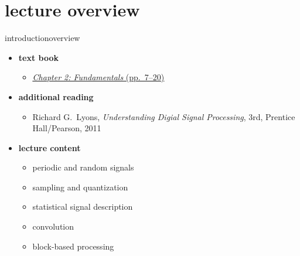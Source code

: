 

\subtitle{Part 3.1: Fundamentals I}


	

    \section[overview]{lecture overview}
        \begin{frame}{introduction}{overview}
            \begin{itemize}
                \item   \textbf{text book}  
                    \begin{itemize}
                        \item   \href{http://ieeexplore.ieee.org/xpl/ebooks/bookPdfWithBanner.jsp?fileName=6331119.pdf&bkn=6266785&pdfType=chapter}{\underline{\textit{Chapter 2: Fundamentals} (pp.~7--20)}}
                    \end{itemize}
                \item   \textbf{additional reading}  
                    \begin{itemize}
                        \item   Richard G.~Lyons, \textit{Understanding Digial Signal Processing}, 3rd, Prentice Hall/Pearson, 2011
                    \end{itemize}
                \bigskip
                \item<2->   \textbf{lecture content}
                    \begin{itemize}
                        \item<2->   periodic and random signals
                        \item<3->   sampling and quantization
                        \item<4->   statistical signal description
                        \item<5->   convolution
                        \item<6->   block-based processing
                    \end{itemize}
            \end{itemize}
        \end{frame}
        
